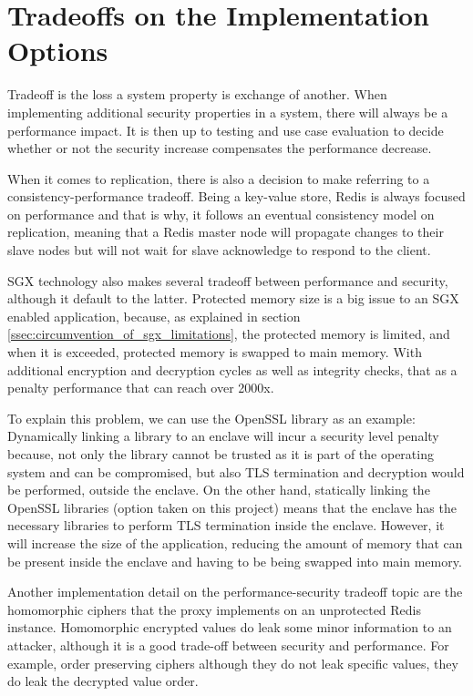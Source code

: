 \section{Tradeoffs on the Implementation Options}
\label{sec:tradeoffs_implementation_options}

Tradeoff is the loss a system property is exchange of another. When implementing additional security properties in a system, there will always be a performance impact. It is then up to testing and use case evaluation to decide whether or not the security increase compensates the performance decrease.

When it comes to replication, there is also a decision to make referring to a consistency-performance tradeoff. Being a key-value store, Redis is always focused on performance and that is why, it follows an eventual consistency model on replication, meaning that a Redis master node will propagate changes to their slave nodes but will not wait for slave acknowledge to respond to the client.

\gls{SGX} technology also makes several tradeoff between performance and security, although it default to the latter. Protected memory size is a big issue to an \gls{SGX} enabled application, because, as explained in section \ref{ssec:circumvention_of_sgx_limitations}, the protected memory is limited, and when it is exceeded, protected memory is swapped to main memory. With additional encryption and decryption cycles as well as integrity checks, that as a penalty performance that can reach over 2000x. 

To explain this problem, we can use the OpenSSL library as an example: Dynamically linking a library to an enclave will incur a security level penalty because, not only the library cannot be trusted as it is part of the operating system and can be compromised, but also \gls{TLS} termination and decryption would be performed, outside the enclave. On the other hand, statically linking the OpenSSL libraries (option taken on this project) means that the enclave has the necessary libraries to perform \gls{TLS} termination inside the enclave. However, it will increase the size of the application, reducing the amount of memory that can be present inside the enclave and having to be being swapped into main memory.

Another implementation detail on the performance-security tradeoff topic are the homomorphic ciphers that the proxy implements on an unprotected Redis instance. Homomorphic encrypted values do leak some minor information to an attacker, although it is a good trade-off between security and performance. For example, order preserving ciphers although they do not leak specific values, they do leak the decrypted value order.

